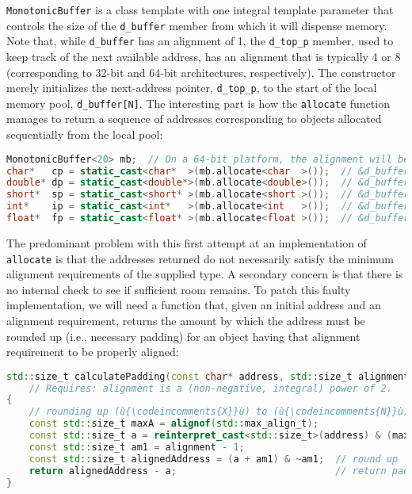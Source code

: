 \noindent \texttt{MonotonicBuffer} is a class template with one integral template
parameter that controls the size of the \texttt{d\_buffer} member from
which it will dispense memory. Note that, while \texttt{d\_buffer} has
an alignment of 1, the \texttt{d\_top\_p} member, used to keep track of
the next available address, has an alignment that is typically 4 or 8
(corresponding to 32-bit and 64-bit architectures, respectively). The
constructor merely initializes the next-address pointer,
\texttt{d\_top\_p}, to the start of the local memory pool,
\texttt{d\_buffer[N]}. The interesting part is how the \texttt{allocate}
function manages to return a sequence of addresses corresponding to
objects allocated sequentially from the local pool:

\begin{lstlisting}[language=C++]
MonotonicBuffer<20> mb;  // On a 64-bit platform, the alignment will be 8.
char*   cp = static_cast<char*  >(mb.allocate<char  >());  // &d_buffer[ 0]
double* dp = static_cast<double*>(mb.allocate<double>());  // &d_buffer[ 1]
short*  sp = static_cast<short* >(mb.allocate<short >());  // &d_buffer[ 9]
int*    ip = static_cast<int*   >(mb.allocate<int   >());  // &d_buffer[11]
float*  fp = static_cast<float* >(mb.allocate<float >());  // &d_buffer[15]
\end{lstlisting}
    
\noindent The predominant problem with this first attempt at an implementation of
\texttt{allocate} is that the addresses returned do not necessarily
satisfy the minimum alignment requirements of the supplied type. A
secondary concern is that there is no internal check to see if
sufficient room remains. To patch this faulty implementation,
we will need a function that, given an initial address and an alignment
requirement, returns the amount by which the address must be rounded up
(i.e., necessary padding) for an object having that alignment
requirement to be properly aligned:

\begin{lstlisting}[language=C++]
std::size_t calculatePadding(const char* address, std::size_t alignment)
    // Requires: alignment is a (non-negative, integral) power of 2.
{
    // rounding up (ù{\codeincomments{X}}ù) to (ù{\codeincomments{N}}ù) (where (ù{\codeincomments{N}}ù) is a power of 2): (ù{\codeincomments{(x + N - 1) \& \textasciitilde(N - 1)}}ù)
    const std::size_t maxA = alignof(std::max_align_t);
    const std::size_t a = reinterpret_cast<std::size_t>(address) & (maxA - 1);
    const std::size_t am1 = alignment - 1;
    const std::size_t alignedAddress = (a + am1) & ~am1;  // round up
    return alignedAddress - a;                            // return padding
}
\end{lstlisting}
    
